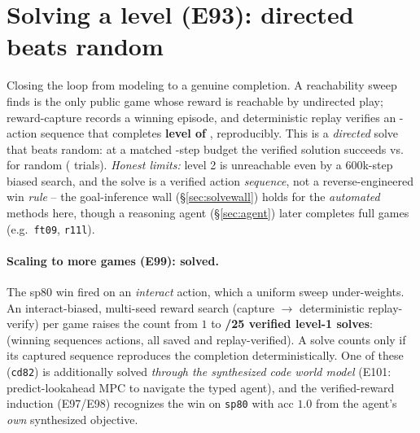 \documentclass[11pt]{article}
\begin{document}
\section{Solving a level (E93): directed beats random}
Closing the loop from modeling to a genuine completion. A reachability sweep finds \texttt{\ArcSolveGame{}}
is the only public game whose reward is reachable by undirected play; reward-capture records a winning
episode, and deterministic replay verifies an \ArcSolveLen-action sequence that completes
\textbf{level \ArcSolveLevel{} of \texttt{\ArcSolveGame{}}}, reproducibly. This is a \emph{directed}
solve that beats random: at a matched \ArcSolveLen-step budget the verified solution succeeds
\textbf{\ArcDirectedRate{}} vs.\ \textbf{\ArcRandomRate{}} for random (\ArcSolveTrials{} trials).
\emph{Honest limits:} level 2 is unreachable even by a 600k-step biased search, and the solve is a
verified action \emph{sequence}, not a reverse-engineered win \emph{rule} -- the goal-inference wall
(\S\ref{sec:solvewall}) holds for the \emph{automated} methods here, though a reasoning agent
(\S\ref{sec:agent}) later completes full games (e.g.\ \texttt{ft09}, \texttt{r11l}).

\paragraph{Scaling to more games (E99): \ArcNSolved{} solved.} The sp80 win fired on an
\emph{interact} action, which a uniform sweep under-weights. An interact-biased, multi-seed reward
search (capture $\to$ deterministic replay-verify) per game raises the count from $1$ to
\textbf{\ArcNSolved{}/25 verified level-1 solves}: \ArcSolvedList{} (winning sequences
\ArcSeqLenRange{} actions, all saved and replay-verified). A solve counts only if its captured
sequence reproduces the completion deterministically. One of these (\texttt{cd82}) is additionally
solved \emph{through the synthesized code world model} (E101: predict-lookahead MPC to navigate the
typed agent), and the verified-reward induction (E97/E98) recognizes the win on \texttt{sp80} with
acc $1.0$ from the agent's \emph{own} synthesized objective.
\end{document}
